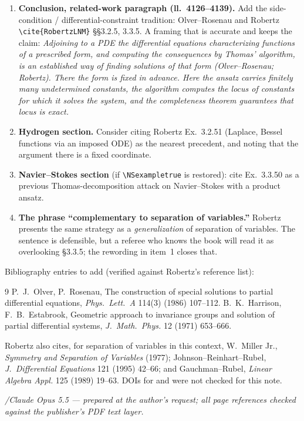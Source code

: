 \documentclass[11pt]{article}
\begin{document}
\begin{enumerate}
\item \textbf{Conclusion, related-work paragraph (ll.~4126--4139).} Add the
  side-condition / differential-constraint tradition: Olver--Rosenau
  \cite{OR86} and Robertz \verb|\cite{RobertzLNM}| \S\S3.2.5, 3.3.5. A
  framing that is accurate and keeps the claim: \emph{Adjoining to a PDE the
  differential equations characterizing functions of a prescribed form, and
  computing the consequences by Thomas' algorithm, is an established way of
  finding solutions of that form (Olver--Rosenau; Robertz). There the form is
  fixed in advance. Here the ansatz carries finitely many undetermined
  constants, the algorithm computes the locus of constants for which it solves
  the system, and the completeness theorem guarantees that locus is
  exact.}
\item \textbf{Hydrogen section.} Consider citing Robertz Ex.~3.2.51 (Laplace,
  Bessel functions via an imposed ODE) as the nearest precedent, and noting
  that the argument there is a fixed coordinate.
\item \textbf{Navier--Stokes section} (if \verb|\NSexampletrue| is restored):
  cite Ex.~3.3.50 as a previous Thomas-decomposition attack on Navier--Stokes
  with a product ansatz.
\item \textbf{The phrase ``complementary to separation of variables.''}
  Robertz presents the same strategy as a \emph{generalization} of separation
  of variables. The sentence is defensible, but a referee who knows the book
  will read it as overlooking \S3.3.5; the rewording in item~1 closes that.
\end{enumerate}

\noindent
Bibliography entries to add (verified against Robertz's reference list):

\begin{thebibliography}{9}
 P.~J.~Olver, P.~Rosenau, The construction of special
  solutions to partial differential equations, \emph{Phys.\ Lett.\ A}
  114(3) (1986) 107--112.
 B.~K.~Harrison, F.~B.~Estabrook, Geometric approach to
  invariance groups and solution of partial differential systems,
  \emph{J.\ Math.\ Phys.} 12 (1971) 653--666.
\end{thebibliography}

\noindent
Robertz also cites, for separation of variables in this context,
W.~Miller Jr., \emph{Symmetry and Separation of Variables} (1977);
Johnson--Reinhart--Rubel, \emph{J.\ Differential Equations} 121 (1995) 42--66;
and Gauchman--Rubel, \emph{Linear Algebra Appl.} 125 (1989) 19--63.
DOIs for \cite{OR86} and \cite{HE71} were not checked for this note.

\vfill
\noindent\small\emph{/Claude Opus 5.5 --- prepared at the author's request;
all page references checked against the publisher's PDF text layer.}
\end{document}

